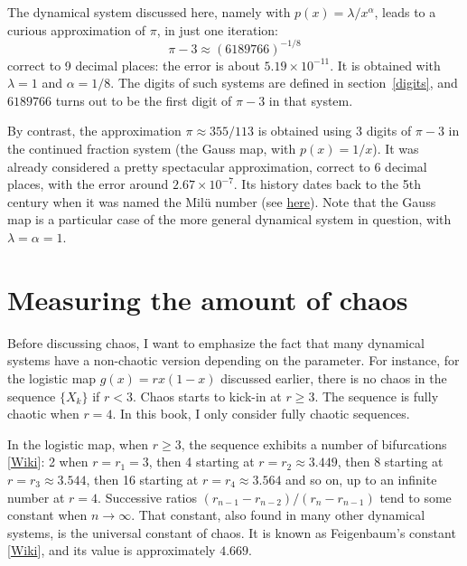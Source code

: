 \documentclass[oneside,10pt]{book}
\begin{document}
The dynamical system discussed here, namely with $p(x)=\lambda/x^\alpha$, leads to a curious approximation of $\pi$, in just one iteration:
$$
\pi - 3 \approx (6189766)^{-1/8} 
$$
correct to 9 decimal places: the error is about $5.19\times 10^{-11}$. It is obtained with $\lambda=1$ and $\alpha=1/8$. The digits of such systems are defined in 
section~\ref{digits}, and $6189766$ turns out to be the first digit of $\pi-3$ in that system. 

By contrast, the
 approximation $\pi \approx 355/113$ is obtained using 3 digits of $\pi-3$ in the continued fraction system (the Gauss map, with
 $p(x)=1/x$). It was
already considered a pretty spectacular approximation, correct to 6 decimal places, with the error
 around $2.67\times 10^{-7}$. Its history dates back to the 5th century 
 when it was named the Milü number (see \href{https://en.wikipedia.org/wiki/Mil\%C3\%BC}{here}). Note that the Gauss map is a particular case of the more general dynamical system in question, with
 $\lambda=\alpha=1$. 


\section{Measuring the amount of chaos}

Before discussing chaos, I want to emphasize the fact that many dynamical systems have a non-chaotic version depending on the parameter.
 For instance, for the \textcolor{index}{logistic map} $g(x)=r x(1-x)$ discussed earlier, 
  there is no chaos in the sequence $\{X_k\}$ if $r<3$. Chaos starts to kick-in at $r\geq 3$. The sequence is fully chaotic when
 $r=4$. In this book, I only consider fully chaotic sequences. 

In the logistic map, when $r\geq 3$, the sequence exhibits a number of \textcolor{index}{bifurcations} [\href{https://en.wikipedia.org/wiki/Bifurcation_theory}{Wiki}]:
 2 when $r=r_1=3$, then 4 starting at $r=r_2 \approx 3.449$, then 8 starting at $r=r_3 \approx 3.544$, 
 then 16 starting at $r =r_4 \approx  3.564$ and so on, up
 to an infinite number at $r=4$. Successive ratios $(r_{n-1}-r_{n-2})/(r_n - r_{n-1})$ tend to some constant when $n\rightarrow \infty$.
 That constant, also found in many other dynamical systems, is the universal constant of chaos. It is known
 as \textcolor{index}{Feigenbaum's constant} [\href{https://en.wikipedia.org/wiki/Feigenbaum_constants}{Wiki}], and its value is approximately $4.669$.
\end{document}
